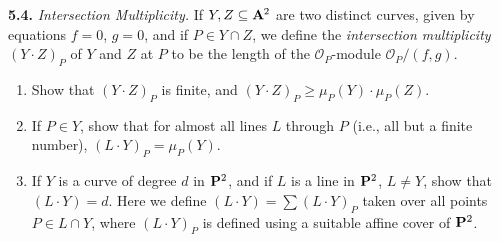 {\smallskip
\noindent\hypertarget{ex-I-5.4}{}\textbf{5.4.} \emph{Intersection Multiplicity.} If $Y,Z\subseteq\AffSpace{2}$ are two distinct curves, given by equations $f=0$, $g=0$, and if $P\in Y\cap Z$, we define the \emph{intersection multiplicity} $(Y\cdot Z)_P$ of $Y$ and $Z$ at $P$ to be the length of the $\mathcal O_P$-module $\mathcal O_P/(f,g)$.
\begin{enumerate}[label=(\alph*),leftmargin=2.4em,nosep]
\item Show that $(Y\cdot Z)_P$ is finite, and $(Y\cdot Z)_P\ge\mu_P(Y)\cdot\mu_P(Z)$.
\item If $P\in Y$, show that for almost all lines $L$ through $P$ (i.e., all but a finite number), $(L\cdot Y)_P=\mu_P(Y)$.
\item If $Y$ is a curve of degree $d$ in $\mathbf{P}^2$, and if $L$ is a line in $\mathbf{P}^2$, $L\ne Y$, show that $(L\cdot Y)=d$. Here we define $(L\cdot Y)=\sum(L\cdot Y)_P$ taken over all points $P\in L\cap Y$, where $(L\cdot Y)_P$ is defined using a suitable affine cover of $\mathbf{P}^2$.
\end{enumerate}}
